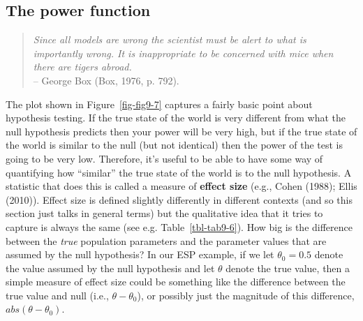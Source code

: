 \documentclass[
  a4paper,
]{book}
\begin{document}
\subsection{The power function}\label{the-power-function-1}

\begin{quote}
\emph{Since all models are wrong the scientist must be alert to what is
importantly wrong. It is inappropriate to be concerned with mice when
there are tigers abroad.}\\
-- George Box (Box, 1976, p. 792).
\end{quote}

The plot shown in Figure~\ref{fig-fig9-7} captures a fairly basic point
about hypothesis testing. If the true state of the world is very
different from what the null hypothesis predicts then your power will be
very high, but if the true state of the world is similar to the null
(but not identical) then the power of the test is going to be very low.
Therefore, it's useful to be able to have some way of quantifying how
``similar'' the true state of the world is to the null hypothesis. A
statistic that does this is called a measure of \textbf{effect size}
(e.g., Cohen (1988); Ellis (2010)). Effect size is defined slightly
differently in different contexts (and so this section just talks in
general terms) but the qualitative idea that it tries to capture is
always the same (see e.g. Table~\ref{tbl-tab9-6}). How big is the
difference between the \emph{true} population parameters and the
parameter values that are assumed by the null hypothesis? In our ESP
example, if we let \(\theta_0 = 0.5\) denote the value assumed by the
null hypothesis and let \(\theta\) denote the true value, then a simple
measure of effect size could be something like the difference between
the true value and null (i.e., \(\theta - \theta_0\)), or possibly just
the magnitude of this difference, \(abs(\theta - \theta_0)\).
\end{document}
